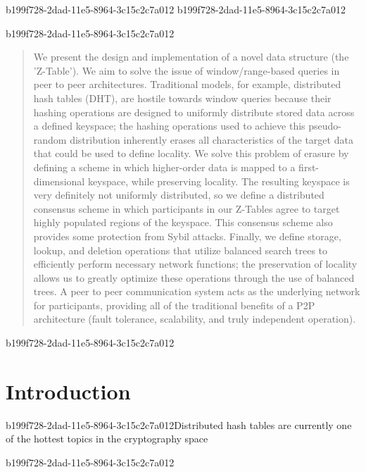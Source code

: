 \documentclass[12pt]{article}
\begin{document}
b199f728-2dad-11e5-8964-3c15c2c7a012
b199f728-2dad-11e5-8964-3c15c2c7a012\maketitle

b199f728-2dad-11e5-8964-3c15c2c7a012\begin{abstract}
We present the design and implementation of a novel data structure (the 'Z-Table'). We aim to solve the issue of window/range-based queries in peer to peer architectures. Traditional models, for example,  distributed hash tables (DHT), are hostile towards window queries because their hashing operations are designed to uniformly distribute stored data across a defined keyspace; the hashing operations used to achieve this pseudo-random distribution inherently erases all characteristics of the target data that could be used to define locality. We solve this problem of erasure by defining a scheme in which higher-order data is mapped to a first-dimensional keyspace, while preserving locality. The resulting keyspace is very definitely not uniformly distributed, so we define a distributed consensus scheme in which participants in our Z-Tables agree to target highly populated regions of the keyspace. This consensus scheme also provides some protection from Sybil attacks. Finally, we define storage, lookup, and deletion operations that utilize balanced search trees to efficiently perform necessary network functions; the preservation of locality allows us to greatly optimize these operations through the use of balanced trees. A peer to peer communication system acts as the underlying network for participants, providing all of the traditional benefits of a P2P architecture (fault tolerance, scalability, and truly independent operation).
\end{abstract}


b199f728-2dad-11e5-8964-3c15c2c7a012\newpage
\section{Introduction}
b199f728-2dad-11e5-8964-3c15c2c7a012Distributed hash tables are currently one of the hottest topics in the cryptography space~\cite{Stoica:2001dj,Rowstron:2001ea,Ratnasamy:2001wn}

b199f728-2dad-11e5-8964-3c15c2c7a012\printbibliography
\end{document}
